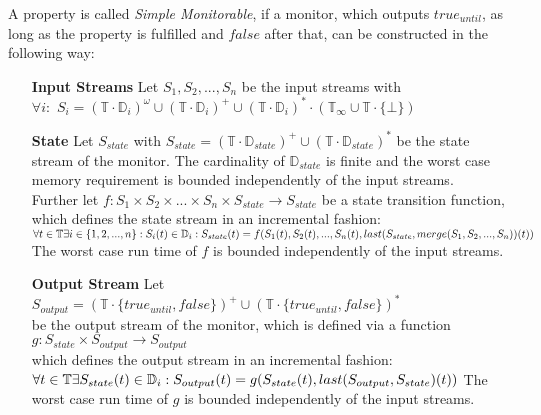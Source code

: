 		\begin{definition}
			A property is called \textit{Simple Monitorable}, if a monitor, which outputs $true_{until}$, as long as the property is fulfilled and $false$ after that, can be constructed in the following way:
			\begin{itemize}
				\item[\textbf{Input Streams}]
					Let $S_1, S_2, ..., S_n$ be the input streams with\\
					$\forall i:$ $S_i=(\mathbb{T}\cdot \mathbb{D}_i)^\omega\cup(\mathbb{T}\cdot \mathbb{D}_i)^+\cup(\mathbb{T}\cdot \mathbb{D}_i)^*\cdot(\mathbb{T}_\infty\cup\mathbb{T}\cdot\{\bot\})$
				\item[\textbf{State}]
					Let $S_{state}$ with $S_{state}= (\mathbb{T}\cdot \mathbb{D}_{state})^+\cup(\mathbb{T}\cdot \mathbb{D}_{state})^*$ be the state stream of the monitor. The cardinality of $\mathbb{D}_{state}$ is finite and the worst case memory requirement is bounded independently of the input streams.\\
					Further let $f: S_1 \times S_2 \times ... \times S_n \times S_{state}\rightarrow S_{state}$ be a state transition function, which defines the state stream in an incremental fashion:
					\begin{math}
						\forall t\in \mathbb T \exists i\in \{1,2,...,n\}: S_i(t)\in\mathbb D_i:\\
						S_{state}(t)= f(S_1(t), S_2(t), ..., S_n(t), last(S_{state}, merge(S_1, S_2, ..., S_n))(t))
					\end{math}\\
					The worst case run time of $f$ is bounded independently of the input streams.
				\item[\textbf{Output Stream}]
					Let $S_{output}= (\mathbb{T}\cdot \{true_{until}, false\})^+\cup(\mathbb{T}\cdot \{true_{until}, false\})^*$\\
					be the output stream of the monitor, which is defined via a function\\
					$g:S_{state}\times S_{output}\rightarrow S_{output}$\\
					which defines the output stream in an incremental fashion:\\
					\begin{math}
						\forall t\in \mathbb T \exists S_{state}(t)\in\mathbb D_i:\\
						S_{output}(t)= g(S_{state}(t), last(S_{output}, S_{state})(t))
					\end{math} 
					The worst case run time of $g$ is bounded independently of the input streams.
			\end{itemize}
		\end{definition}

